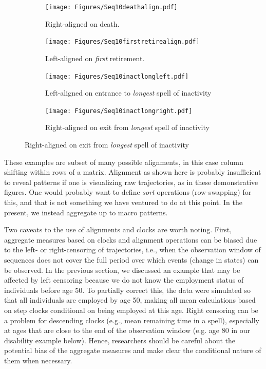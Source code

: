 \documentclass{article}
\begin{document}
 \begin{figure}[ht!]
\centering
\caption{The sequences from Figure~\ref{fig:seq10} under a variety of alignment
types.}
\label{fig:alignment}

\begin{subfigure}{\textwidth}
\centering
\caption{Right-aligned on death.}
\label{fig:seq10death}
\texttt{[image: Figures/Seq10deathalign.pdf]}
\end{subfigure}

\begin{subfigure}{\textwidth}
\centering
\caption{Left-aligned on \emph{first} retirement.}
\label{fig:firstretire}
\texttt{[image: Figures/Seq10firstretirealign.pdf]}
\end{subfigure}

\begin{subfigure}{\textwidth}
\centering
\caption{Left-aligned on entrance to \emph{longest} spell of inactivity}
\label{fig:longinactleft}
\texttt{[image: Figures/Seq10inactlongleft.pdf]}
\end{subfigure}

\begin{subfigure}{\textwidth}
\centering
\caption{Right-aligned on exit from \emph{longest} spell of inactivity}
\label{fig:longinactright}
\texttt{[image: Figures/Seq10inactlongright.pdf]}
\end{subfigure}

\end{figure}

These examples are subset of many possible alignments, in this case column shifting within rows of a matrix. Alignment as shown here is probably insufficient to reveal patterns if one is visualizing raw trajectories, as in these demonstrative figures. One would probably want to define \emph{sort} operations (row-swapping) for this, and that is not something we have ventured to do at this point. In the present, we instead aggregate up to macro patterns.

Two caveats to the use of alignments and clocks are worth noting. First, aggregate measures based on clocks and alignment operations can be biased due to the left- or right-censoring of trajectories, i.e., when the observation window of sequences does not cover the full period over which events (change in states) can be observed. In the previous section, we discussed an example that may be affected by left censoring because we do not know the employment status of individuals before age 50. To partially correct this, the data were simulated so that all individuals are employed by age 50, making all mean calculations based on step clocks conditional on being employed at this age. Right censoring can be a problem for descending clocks (e.g., mean remaining time in a spell), especially at ages that are close to the end of the observation window (e.g. age 80 in our disability example below). Hence, researchers should be careful about the potential bias of the aggregate measures and make clear the conditional nature of them when necessary.
\end{document}
